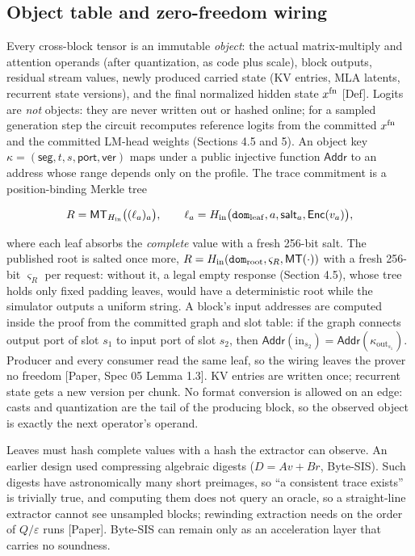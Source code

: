 \documentclass[10pt]{article}
\begin{document}
\subsection{Object table and zero-freedom wiring}
Every cross-block tensor is an immutable \emph{object}: the actual matrix-multiply and attention operands (after quantization, as code plus scale), block outputs, residual stream values, newly produced carried state (KV entries, MLA latents, recurrent state versions), and the final normalized hidden state $x^{\rm fn}$ [Def]. Logits are \emph{not} objects: they are never written out or hashed online; for a sampled generation step the circuit recomputes reference logits from the committed $x^{\rm fn}$ and the committed LM-head weights (Sections 4.5 and 5). An object key $\kappa=(\mathsf{seg},t,s,\mathsf{port},\mathsf{ver})$ maps under a public injective function $\mathsf{Addr}$ to an address whose range depends only on the profile. The trace commitment is a position-binding Merkle tree

\[R=\mathsf{MT}_{H_{\rm in}}\big((\ell_a)_{a}\big),\qquad \ell_a=H_{\rm in}\big(\texttt{dom}_{\rm leaf},a,\mathsf{salt}_a,\mathsf{Enc}(v_a)\big),\]

where each leaf absorbs the \emph{complete} value with a fresh 256-bit salt. The published root is salted once more, $R=H_{\rm in}(\texttt{dom}_{\rm root},\varsigma_R,\mathsf{MT}(\cdot))$ with a fresh 256-bit $\varsigma_R$ per request: without it, a legal empty response (Section 4.5), whose tree holds only fixed padding leaves, would have a deterministic root while the simulator outputs a uniform string. A block's input addresses are computed inside the proof from the committed graph and slot table: if the graph connects output port of slot $s_1$ to input port of slot $s_2$, then $\mathsf{Addr}(\mathrm{in}_{s_2})=\mathsf{Addr}(\kappa_{\mathrm{out}_{s_1}})$. Producer and every consumer read the same leaf, so the wiring leaves the prover no freedom [Paper, Spec 05 Lemma 1.3]. KV entries are written once; recurrent state gets a new version per chunk. No format conversion is allowed on an edge: casts and quantization are the tail of the producing block, so the observed object is exactly the next operator's operand.

Leaves must hash complete values with a hash the extractor can observe. An earlier design used compressing algebraic digests ($D=Av+Br$, Byte-SIS). Such digests have astronomically many short preimages, so ``a consistent trace exists'' is trivially true, and computing them does not query an oracle, so a straight-line extractor cannot see unsampled blocks; rewinding extraction needs on the order of $Q/\varepsilon$ runs [Paper]. Byte-SIS can remain only as an acceleration layer that carries no soundness.
\end{document}
